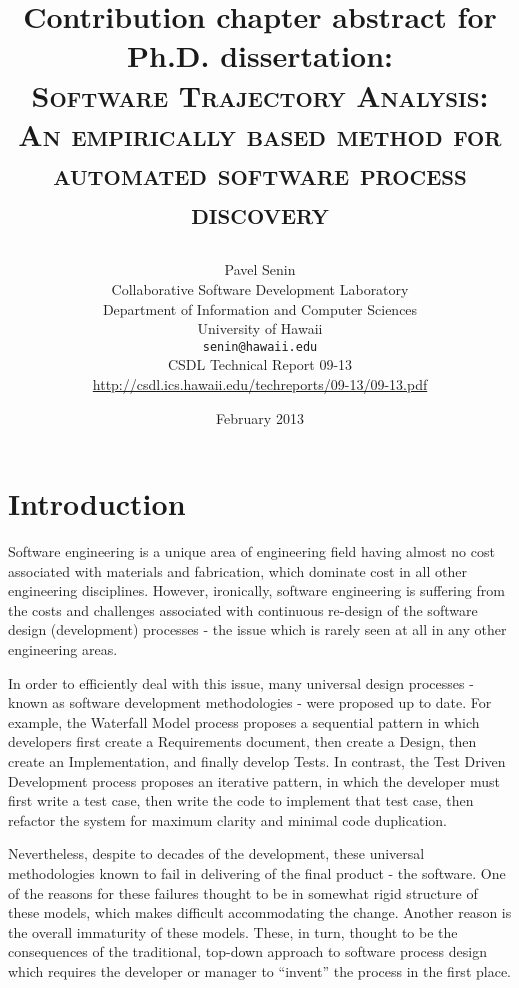 \documentclass[11pt,oneside]{article}
\numberwithin{equation}{subsection}
\begin{document}
\title{Contribution chapter abstract for Ph.D. dissertation: \\
       \textsc{Software Trajectory Analysis:} \\
       \textsc{An empirically based method for automated software process discovery} \\
       \author{Pavel Senin \\
               Collaborative Software Development Laboratory \\
               Department of Information and Computer Sciences \\
               University of Hawaii \\[0.3cm]
               \texttt{senin@hawaii.edu} \\[0.3cm]
               CSDL Technical Report 09-13 \\
               \url{http://csdl.ics.hawaii.edu/techreports/09-13/09-13.pdf}
       }
       \date{February 2013}
}
\maketitle

\clearpage


\section{Introduction}
Software engineering is a unique area of engineering field having almost no cost associated with
materials
and fabrication, which dominate cost in all other engineering disciplines. 
However, ironically, software engineering is suffering from the costs and challenges
associated with continuous re-design of the software design (development) processes - the issue
which is rarely seen at all in any other engineering areas. 

In order to efficiently deal with this issue, many universal design processes - known as 
software development methodologies - were proposed up to date. 
For example, the Waterfall Model process proposes a sequential pattern in which developers 
first create a Requirements document, then create a Design, then create an Implementation, 
and finally develop Tests. 
In contrast, the Test Driven Development process proposes an iterative pattern,
in which the developer  must first write a test case, then write the code to implement 
that test case, then refactor  the system for maximum clarity and minimal code duplication.

Nevertheless, despite to decades of the development, these universal methodologies known to fail in
delivering of the final product - the software. One of the reasons for these failures thought to be
in somewhat rigid structure of these models, which makes difficult accommodating the change.
Another reason is the overall immaturity of these models. These, in turn, thought to be the
consequences of the traditional, top-down approach to software process design which requires the
developer or manager to ``invent'' the process in the first place. 
\end{document}
